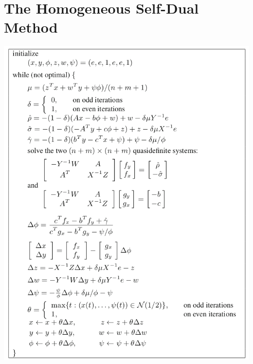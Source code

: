 \documentclass[11pt]{article}
\begin{document}
\section{The Homogeneous Self-Dual Method}
\label{sec:org1abee69}
\begin{center}
\includegraphics[width=.9\linewidth]{The Homogeneous Self-Dual Method/screenshot_2019-03-13_10-36-58.png}
\end{center}
\end{document}
